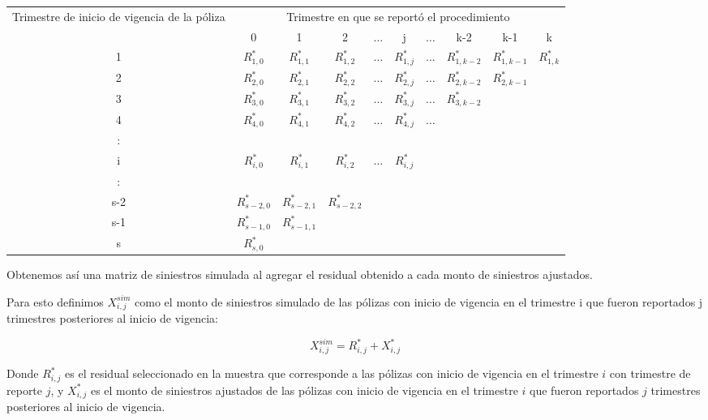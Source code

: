 \documentclass[11pt,twoside,openright,spanish]{report}
\numberwithin{equation}{chapter}
\numberwithin{figure}{chapter}
\numberwithin{table}{chapter}
\begin{document}
	\begin{table}[H]
		\centering
		\begin{tabularx}{\linewidth}{ c |ccccccccc}
			\multirow{2}{4cm}{Trimestre de inicio de vigencia de la póliza}& \multicolumn{9}{c}{Trimestre en que se reportó el procedimiento} \\
			& 0  & 1 & 2 & $ \dots $ & j & $\dots $ & k-2 & k-1 &  k\\
			\midrule
			1      &  $R_{1,0}^{*}$ & $R_{1,1}^{*}$ & $R_{1,2}^{*}$ & $ \dots $ & $R_{1,j}^{*}$ & $ \dots $ & $R_{1,k-2}^{*}$ & $R_{1,k-1}^{*}$ & $R_{1,k}^{*}$ \\
			2      &  $R_{2,0}^{*}$ & $R_{2,1}^{*}$ & $R_{2,2}^{*}$ & $ \dots $ & $R_{2,j}^{*}$ & $ \dots $ & $R_{2,k-2}^{*}$ & $R_{2,k-1}^{*}$ & \\
			3      &  $R_{3,0}^{*}$ & $R_{3,1}^{*}$ & $R_{3,2}^{*}$ & $ \dots $ & $R_{3,j}^{*}$ & $ \dots $ & $R_{3,k-2}^{*}$ & & \\
			4      &  $R_{4,0}^{*}$ & $R_{4,1}^{*}$ & $R_{4,2}^{*}$ & $ \dots $ & $R_{4,j}^{*}$ & $ \dots $ & & & \\
			:      & & & & & & & & & \\
			i      &  $R_{i,0}^{*}$ & $R_{i,1}^{*}$ & $R_{i,2}^{*}$ & $ \dots $ & $R_{i,j}^{*}$ & & & & \\
			:      & & & & & & & & & \\
			s-2      &  $R_{s-2,0}^{*}$ & $R_{s-2,1}^{*}$ & $R_{s-2,2}^{*}$ & & & & & & \\
			s-1      &  $R_{s-1,0}^{*}$ & $R_{s-1,1}^{*}$ & & & & & & & \\
			s      &  $R_{s,0}^{*}$ & & & & & & & & \\
		\end{tabularx}
	\end{table}

	Obtenemos así una matriz de siniestros simulada al agregar el residual obtenido a cada monto de siniestros ajustados.
	
	Para esto definimos $X_{i,j}^{sim}$ como el monto de siniestros simulado de las pólizas con inicio de vigencia en el trimestre i que fueron reportados j trimestres posteriores al inicio de vigencia:
	
	$$X_{i,j}^{sim}=R_{i,j}^{*}+X_{i,j}^{*}$$ 
	
	Donde $R_{i,j}^{*}$ es el residual seleccionado en la muestra que corresponde a las pólizas con inicio de vigencia en el trimestre $i$ con trimestre de reporte $j$, y $X_{i,j}^{*}$ es el monto de siniestros ajustados de las pólizas con inicio de vigencia en el trimestre $i$ que fueron reportados $j$ trimestres posteriores al inicio de vigencia.
	
\end{document}
